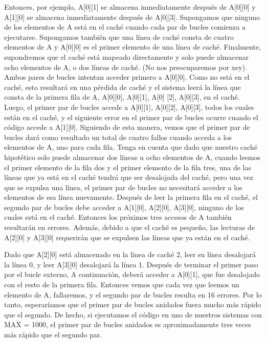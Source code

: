 \documentclass[12pt]{article}
\begin{document}
Entonces, por ejemplo, A[0][1] se almacena inmediatamente después de A[0][0] y A[1][0] se almacena inmediatamente después de A[0][3]. Supongamos que ninguno de los elementos de A está en el caché cuando cada par de bucles comienza a ejecutarse. Supongamos también que una línea de caché consta de cuatro elementos de A y A[0][0] es el primer elemento de una línea de caché.
Finalmente, supondremos que el caché está mapeado directamente y solo puede almacenar ocho elementos de A, o dos líneas de caché. (No nos preocuparemos por xey). Ambos pares de bucles intentan acceder primero a A[0][0]. Como no está en el caché, esto resultará en una pérdida de caché y el sistema leerá la línea que consta de la primera fila de A, A[0][0], A[0][1], A[0] [2], A[0][3], en el caché. Luego, el primer par de bucles accede a A[0][1], A[0][2], A[0][3], todos los cuales están en el caché, y el siguiente error en el primer par de bucles ocurre cuando el código accede a A[1][0].
Siguiendo de esta manera, vemos que el primer par de bucles dará como resultado un total de cuatro fallos cuando acceda a los elementos de A, uno para cada fila. Tenga en cuenta que dado que nuestro caché hipotético solo puede almacenar dos líneas u ocho elementos de A, cuando leemos el primer elemento de la fila dos y el primer elemento de la fila tres, una de las líneas que ya está en el caché tendrá que ser desalojada del caché, pero una vez que se expulsa una línea, el primer par de bucles no necesitará acceder a los elementos de esa línea nuevamente.
Después de leer la primera fila en el caché, el segundo par de bucles debe acceder a A[1][0], A[2][0], A[3][0], ninguno de los cuales está en el caché. Entonces los próximos tres accesos de A también resultarán en errores. Además, debido a que el caché es pequeño, las lecturas de A[2][0] y A[3][0] requerirán que se expulsen las líneas que ya están en el caché.

Dado que A[2][0] está almacenado en la línea de caché 2, leer su línea desalojará la línea 0, y leer A[3][0] desalojará la línea 1. Después de terminar el primer paso por el bucle externo, A continuación, deberá acceder a A[0][1], que fue desalojado con el resto de la primera fila. Entonces vemos que cada vez que leemos un elemento de A, fallaremos, y el segundo par de bucles resulta en 16 errores. Por lo tanto, esperaríamos que el primer par de bucles anidados fuera mucho más rápido que el segundo. De hecho, si ejecutamos el código en uno de nuestros sistemas con MAX = 1000, el primer par de bucles anidados es aproximadamente tres veces más rápido que el segundo par\cite{pacheco2011introduction}.
\end{document}
